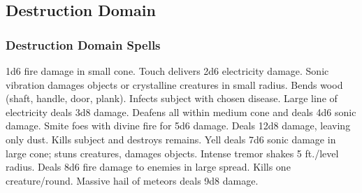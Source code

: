 \subsection{Destruction Domain}

\subsubsection{Destruction Domain Spells}
\begin{spelllist}
   1d6 fire damage in small cone.
   Touch delivers 2d6 electricity damage.
   Sonic vibration damages objects or crystalline creatures in small radius.
   Bends wood (shaft, handle, door, plank).
   Infects subject with chosen disease.
   Large line of electricity deals 3d8 damage.
   Deafens all within medium cone and deals 4d6 sonic damage.
  \spellhead[4]{}
   Smite foes with divine fire for 5d6 damage.
  \spellhead[5]{}
   Deals 12d8 damage, leaving only dust.
  \F Kills subject and destroys remains.
   Yell deals 7d6 sonic damage in large cone; stuns creatures, damages objects.
   Intense tremor shakes 5 ft./level radius.
   Deals 8d6 fire damage to enemies in large spread.
   Kills one creature/round.
   Massive hail of meteors deals 9d8 damage.
\end{spelllist}

